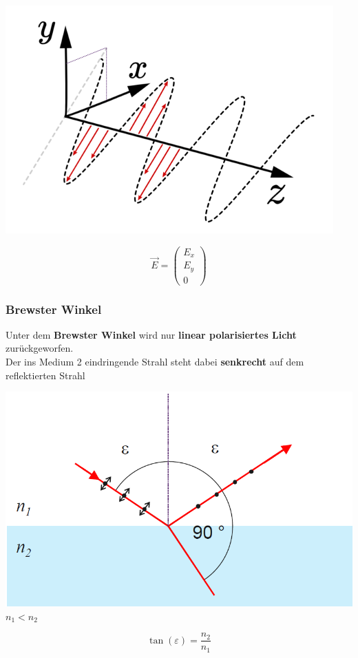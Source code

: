 \begin{minipage}{0.48\linewidth}
\includegraphics[width=0.9\linewidth]{Bilder/Wellen-Optik/lineare_Polarisation}
\end{minipage}
\hfill
\begin{minipage}{0.48\linewidth}
$$ \boxed{  \vec{E} = \begin{pmatrix} E_x \\  E_y \\  0  \end{pmatrix}  } $$


\end{minipage}




\subsubsection{Brewster Winkel}

Unter dem \textbf{Brewster Winkel} wird nur \textbf{linear polarisiertes Licht} zurückgeworfen. \\
Der ins Medium 2 eindringende Strahl steht dabei \textbf{senkrecht} auf dem reflektierten Strahl \\

\begin{minipage}{0.48\linewidth}
\includegraphics[width=0.75\linewidth]{Bilder/Wellen-Optik/brewster_winkel} \\
$n_1 < n_2$ \\
\end{minipage}
\hfill
\begin{minipage}{0.48\linewidth}
$$ \boxed{  \tan(\varepsilon) = \frac{n_2}{n_1}  }$$

\end{minipage}


